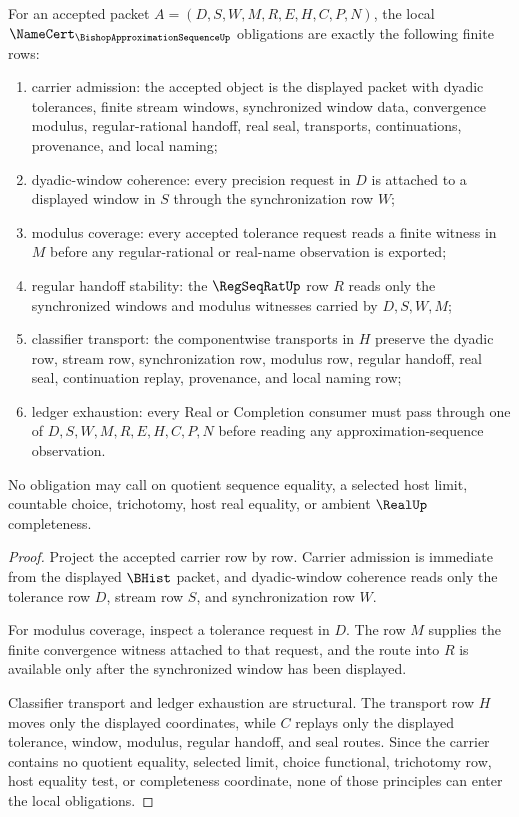 \begin{theorem}
\label{thm:bishop-approximation-sequence-namecert-obligations}
For an accepted packet $A=(D,S,W,M,R,E,H,C,P,N)$, the local $\NameCert_{\BishopApproximationSequenceUp}$ obligations are exactly the following finite rows:
\begin{enumerate}
\item carrier admission: the accepted object is the displayed packet with dyadic tolerances, finite stream windows, synchronized window data, convergence modulus, regular-rational handoff, real seal, transports, continuations, provenance, and local naming;
\item dyadic-window coherence: every precision request in $D$ is attached to a displayed window in $S$ through the synchronization row $W$;
\item modulus coverage: every accepted tolerance request reads a finite witness in $M$ before any regular-rational or real-name observation is exported;
\item regular handoff stability: the $\RegSeqRatUp$ row $R$ reads only the synchronized windows and modulus witnesses carried by $D,S,W,M$;
\item classifier transport: the componentwise transports in $H$ preserve the dyadic row, stream row, synchronization row, modulus row, regular handoff, real seal, continuation replay, provenance, and local naming row;
\item ledger exhaustion: every Real or Completion consumer must pass through one of $D,S,W,M,R,E,H,C,P,N$ before reading any approximation-sequence observation.
\end{enumerate}
No obligation may call on quotient sequence equality, a selected host limit, countable choice, trichotomy, host real equality, or ambient $\RealUp$ completeness.
\end{theorem}
\begin{proof}
Project the accepted carrier row by row. Carrier admission is immediate from the displayed $\BHist$ packet, and dyadic-window coherence reads only the tolerance row $D$, stream row $S$, and synchronization row $W$.

For modulus coverage, inspect a tolerance request in $D$. The row $M$ supplies the finite convergence witness attached to that request, and the route into $R$ is available only after the synchronized window has been displayed.

Classifier transport and ledger exhaustion are structural. The transport row $H$ moves only the displayed coordinates, while $C$ replays only the displayed tolerance, window, modulus, regular handoff, and seal routes. Since the carrier contains no quotient equality, selected limit, choice functional, trichotomy row, host equality test, or completeness coordinate, none of those principles can enter the local obligations.
\end{proof}


